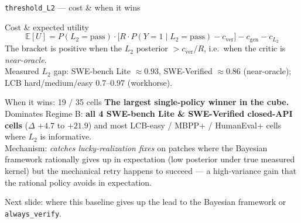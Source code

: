 \documentclass[10pt]{beamer}
\newcommand{\good}[1]{\textcolor{accentGreen}{\textbf{#1}}}
\begin{document}
\begin{frame}[fragile]{\texttt{threshold\_L2} --- cost \& when it wins}
\begin{block}{Cost \& expected utility}
\footnotesize
\[
\mathbb{E}[U] = P(L_2{=}\text{pass}) \cdot \bigl[R \cdot P(Y{=}1\!\mid\! L_2{=}\text{pass})
- c_\text{ver}\bigr] - c_\text{gen} - c_{L_2}
\]
The bracket is positive when the $L_2$ posterior $> c_\text{ver}/R$, i.e.\
when the critic is \emph{near-oracle}. \\[3pt]
Measured $L_2$ gap: SWE-bench Lite $\approx 0.93$, SWE-Verified $\approx
0.86$ (near-oracle); LCB hard/medium/easy $0.7$--$0.97$ (workhorse).
\end{block}

\begin{exampleblock}{When it wins: 19 / 35 cells}
\good{The largest single-policy winner in the cube.} Dominates Regime B:
\textbf{all 4 SWE-bench Lite \& SWE-Verified closed-API cells}
($\Delta$ $+4.7$ to $+21.9$) and most LCB-easy / MBPP+ / HumanEval+ cells
where $L_2$ is informative. \\[3pt]
Mechanism: \emph{catches lucky-realization fixes} on patches where the
Bayesian framework rationally gives up in expectation (low posterior under
true measured kernel) but the mechanical retry happens to succeed --- a
high-variance gain that the rational policy avoids in expectation.
\end{exampleblock}

\textcolor{softGrey}{\scriptsize Next slide: where this baseline gives up
the lead to the Bayesian framework or \texttt{always\_verify}.}
\end{frame}
\end{document}
